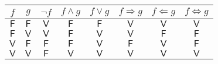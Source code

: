 \begin{center}
\begin{tabular}{c c | c c c c c c}
    $f$ & $g$ & $\neg f$ & $f \wedge g$ & $f \vee g$ & $f \Rightarrow g$ & $f \Leftarrow g$ & $f \Leftrightarrow g$ 
    \\ \hline 
    $\mathsf{F}$ & $\mathsf{F}$ & $\mathsf{V}$ & $\mathsf{F}$ & $\mathsf{F}$ & $\mathsf{V}$ & $\mathsf{V}$ & $\mathsf{V}$
    \\
    $\mathsf{F}$ & $\mathsf{V}$ & $\mathsf{V}$ & $\mathsf{F}$ & $\mathsf{V}$ & $\mathsf{V}$ & $\mathsf{F}$ & $\mathsf{F}$
    \\ 
    $\mathsf{V}$ & $\mathsf{F}$ & $\mathsf{F}$ & $\mathsf{F}$ & $\mathsf{V}$ & $\mathsf{F}$ & $\mathsf{V}$ & $\mathsf{F}$ 
    \\ 
    $\mathsf{V}$ & $\mathsf{V}$ & $\mathsf{F}$ & $\mathsf{V}$ & $\mathsf{V}$ & $\mathsf{V}$ & $\mathsf{V}$ & $\mathsf{V}$ 
\end{tabular}
\end{center}

